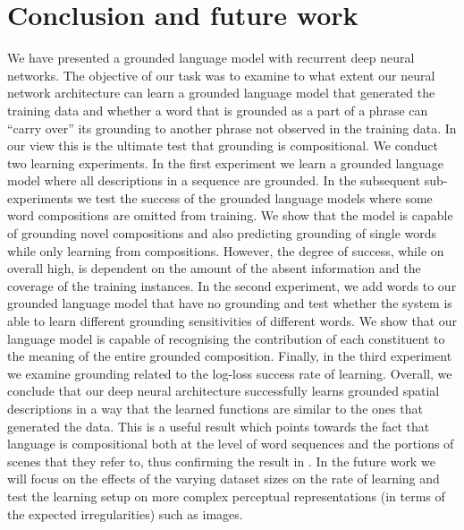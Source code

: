 \section{Conclusion and future work}\label{iwcs2017:sec:conclusions}

We have presented a grounded language model with recurrent deep
neural networks. The objective of our task was to examine to what extent our
neural network architecture can learn a grounded language model that generated
the training data and whether a word that is grounded as a part of a phrase can
``carry over'' its grounding to another phrase not observed in the training
data. In our view this is the ultimate test that grounding is compositional. We
conduct two learning experiments. In the first experiment we learn a grounded
language model where all descriptions in a sequence are grounded. In the
subsequent sub-experiments we test the success of the grounded language models
where some word compositions are omitted from training. We show that the model is
capable of grounding novel compositions and also predicting grounding of single
words while only learning from compositions. However, the degree of success, while
on overall high, is dependent on the amount of the absent information and the
coverage of the training instances. In the second experiment, we add words to our
grounded language model that have no grounding and test whether the system is
able to learn different grounding sensitivities of different words. We show that
our language model is capable of recognising the contribution of each
constituent to the meaning of the entire grounded composition. Finally, in the
third experiment we examine grounding related to the log-loss success rate of
learning. Overall, we conclude that our deep neural architecture successfully
learns grounded spatial descriptions in a way that the learned functions are similar to the ones that generated the data.
This is a useful result which points towards the fact that language is
compositional both at the level of word sequences and the portions of scenes
that they refer to, thus confirming the result in \cite{Dobnik:2017ac}. In the future work we will focus on the effects of the
varying dataset sizes on the rate of learning and test the learning setup on
more complex perceptual representations (in terms of the expected
irregularities) such as images.


\clearpage


